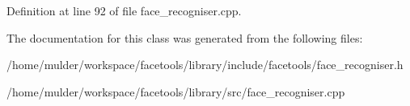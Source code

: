 Definition at line 92 of file face\+\_\+recogniser.\+cpp.



The documentation for this class was generated from the following files\+:\begin{DoxyCompactItemize}
\item 
/home/mulder/workspace/facetools/library/include/facetools/face\+\_\+recogniser.\+h\item 
/home/mulder/workspace/facetools/library/src/face\+\_\+recogniser.\+cpp\end{DoxyCompactItemize}
